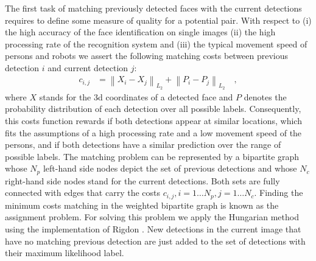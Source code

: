 The first task of matching previously detected faces with the current detections requires to define some measure of quality for a potential pair. With respect to (i) the high accuracy of the face identification on single images (ii) the high processing rate of the recognition system and (iii) the typical movement speed of persons and robots we assert the following matching costs between previous detection $i$ and current detection $j$:
\begin{align}
	c_{i,j} & = \left\| X_i - X_j \right\|_{L_2} + \left\| P_i - P_j \right\|_{L_2} \quad ,
\end{align}
where $X$ stands for the 3d coordinates of a detected face and $P$ denotes the probability distribution of each detection over all possible labels. Consequently, this costs function rewards if both detections appear at similar locations, which fits the assumptions of a high processing rate and a low movement speed of the persons, and if both detections have a similar prediction over the range of possible labels. The matching problem can be represented by a bipartite graph whose $N_p$ left-hand side nodes depict the set of previous detections and whose $N_c$ right-hand side nodes stand for the current detections. Both sets are fully connected with edges that carry the costs $c_{i,j}, i=1\ldots N_p, j=1\ldots N_c$. Finding the minimum costs matching in the weighted bipartite graph is known as the assignment problem. For solving this problem we apply the Hungarian method using the implementation of Rigdon \cite{rigdon2008_munkres}. New detections in the current image that have no matching previous detection are just added to the set of detections with their maximum likelihood label.

